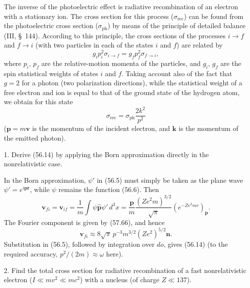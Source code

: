 The inverse of the photoelectric effect is radiative recombination of an electron with a stationary ion. The cross section for this process ($\sigma_{\text{rec}}$) can be found from the photoelectric cross section ($\sigma_{\text{ph}}$) by means of the principle of detailed balance (III, \S~144). According to this principle, the cross sections of the processes $i\to f$ and $f\to i$ (with two particles in each of the states $i$ and $f$) are related by
\[
g_i p_i^2\sigma_{i\to f}=g_f p_f^2\sigma_{f\to i},
\]
where $p_i$, $p_f$ are the relative-motion momenta of the particles, and $g_i$, $g_f$ are the spin statistical weights of states $i$ and $f$. Taking account also of the fact that $g=2$ for a photon (two polarization directions), while the statistical weight of a free electron and ion is equal to that of the ground state of the hydrogen atom, we obtain for this state
\begin{equation}
\sigma_{\text{rec}}=\sigma_{\text{ph}}\frac{2k^2}{p^2}
\tag{56.15}
\end{equation}
($\mathbf p=m\mathbf v$ is the momentum of the incident electron, and $\mathbf k$ is the momentum of the emitted photon).

\ProblemHeading

1. Derive (56.14) by applying the Born approximation directly in the nonrelativistic case.

\SolutionHeading In the Born approximation, $\psi'$ in (56.5) must simply be taken as the plane wave $\psi'=e^{i\mathbf p\mathbf r}$, while $\psi$ remains the function (56.6). Then
\[
\mathbf v_{fi}=\mathbf v_{if}
=\frac1m\int\psi\hat{\mathbf p}\psi'\,d^3x
=\frac{\mathbf p}{m}\frac{(Ze^2m)^{3/2}}{\sqrt\pi}
(e^{-Ze^2mr})_{\mathbf p}.
\]
The Fourier component is given by (57.66), and hence
\[
\mathbf v_{fi}\approx8\sqrt\pi\,p^{-3}m^{3/2}(Ze^2)^{5/2}\mathbf n.
\]
Substitution in (56.5), followed by integration over $do$, gives (56.14) (to the required accuracy, $p^2/(2m)\approx\omega$ here).

2. Find the total cross section for radiative recombination of a fast nonrelativistic electron ($I\ll mv^2\ll mc^2$) with a nucleus (of charge $Z\ll137$).

